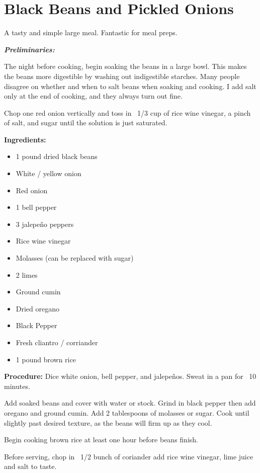 \section{Black Beans and Pickled Onions} %
A tasty and simple large meal. Fantastic for meal preps.

\textbf{\large{\emph{Preliminaries:}}}

The night before cooking, begin soaking the beans in a large bowl. This makes the beans more digestible by washing out indigestible starches.
Many people disagree on whether and when to salt beans when soaking and cooking. I add salt only at the end of cooking, and they always turn out fine.

Chop one red onion vertically and toss in ~1/3 cup of rice wine vinegar, a pinch of salt, and sugar until the solution is just saturated.

\begin{multicols}{2}\raggedcolumns
\textbf{Ingredients:}

\begin{itemize}
	\item 1 pound dried black beans
	\item White / yellow onion
	\item Red onion
	\item 1 bell pepper
	\item 3 jalepeño peppers
	\item Rice wine vinegar
	\item Molasses (can be replaced with sugar)
	\item 2 limes
	\item Ground cumin
	\item Dried oregano
	\item Black Pepper
	\item Fresh cliantro / corriander
	\item 1 pound brown rice
\end{itemize}

\columnbreak

\textbf{Procedure:}
Dice white onion, bell pepper, and jalepeños. Sweat in a pan for ~10 minutes.

Add soaked beans and cover with water or stock. Grind in black pepper then add oregano and ground cumin.
Add 2 tablespoons of molasses or sugar. Cook until slightly past desired texture, as the beans will firm up as they cool.

Begin cooking brown rice at least one hour before beans finish.

Before serving, chop in ~1/2 bunch of coriander add rice wine vinegar, lime juice and salt to taste.

\end{multicols}
